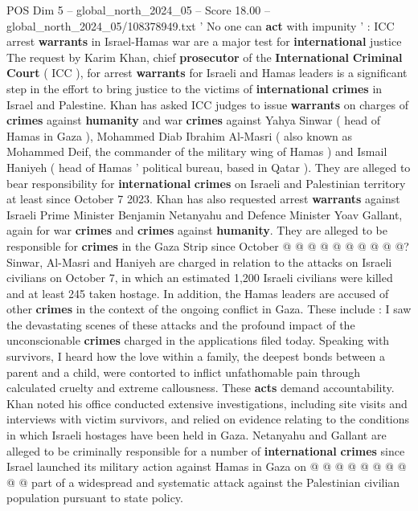 \begin{textsample}{POS Dim 5 – global\_north\_2024\_05 – Score 18.00 – global\_north\_2024\_05/108378949.txt}  \label{ex:f5_pos_170}
' No one can \textbf{act} with impunity ' : ICC arrest \textbf{warrants} in Israel-Hamas war are a major test for \textbf{international} justice The request by Karim Khan, chief \textbf{prosecutor} of the \textbf{International} \textbf{Criminal} \textbf{Court} ( ICC ), for arrest \textbf{warrants} for Israeli and Hamas leaders is a significant step in the effort to bring justice to the victims of \textbf{international} \textbf{crimes} in Israel and Palestine.
Khan has asked ICC judges to issue \textbf{warrants} on charges of \textbf{crimes} against \textbf{humanity} and war \textbf{crimes} against Yahya Sinwar ( head of Hamas in Gaza ), Mohammed Diab Ibrahim Al-Masri ( also known as Mohammed Deif, the commander of the military wing of Hamas ) and Ismail Haniyeh ( head of Hamas ' political bureau, based in Qatar ).
They are alleged to bear responsibility for \textbf{international} \textbf{crimes} on Israeli and Palestinian territory at least since October 7 2023.
Khan has also requested arrest \textbf{warrants} against Israeli Prime Minister Benjamin Netanyahu and Defence Minister Yoav Gallant, again for war \textbf{crimes} and \textbf{crimes} against \textbf{humanity}.
They are alleged to be responsible for \textbf{crimes} in the Gaza Strip since October @ @ @ @ @ @ @ @ @ @?
Sinwar, Al-Masri and Haniyeh are charged in relation to the attacks on Israeli civilians on October 7, in which an estimated 1,200 Israeli civilians were killed and at least 245 taken hostage.
In addition, the Hamas leaders are accused of other \textbf{crimes} in the context of the ongoing conflict in Gaza.
These include : I saw the devastating scenes of these attacks and the profound impact of the unconscionable \textbf{crimes} charged in the applications filed today.
Speaking with survivors, I heard how the love within a family, the deepest bonds between a parent and a child, were contorted to inflict unfathomable pain through calculated cruelty and extreme callousness.
These \textbf{acts} demand accountability.
Khan noted his office conducted extensive investigations, including site visits and interviews with victim survivors, and relied on evidence relating to the conditions in which Israeli hostages have been held in Gaza.
Netanyahu and Gallant are alleged to be criminally responsible for a number of \textbf{international} \textbf{crimes} since Israel launched its military action against Hamas in Gaza on @ @ @ @ @ @ @ @ @ @ part of a widespread and systematic attack against the Palestinian civilian population pursuant to state policy.

\end{textsample}
